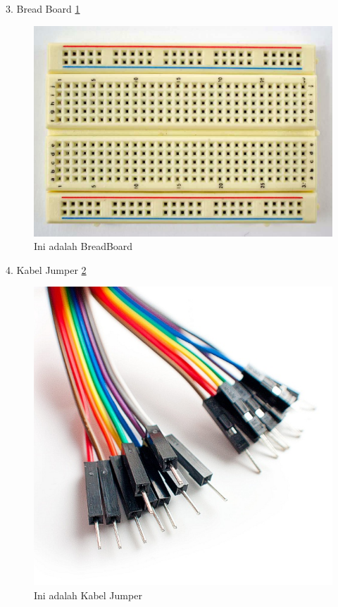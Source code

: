 \documentclass{article}
\begin{document}
 3. Bread Board
 \ref{brb}
  \begin{figure}[ht]
  \centerline{\includegraphics[width=1\textwidth]{../figures/brb.jpg}}
  \caption{Ini adalah BreadBoard}
  \label{brb}
  \end{figure}

 4. Kabel Jumper
 \ref{jumper}
  \begin{figure}[ht]
  \centerline{\includegraphics[width=1\textwidth]{../figures/jumper.jpg}}
  \caption{Ini adalah Kabel Jumper}
  \label{jumper}
  \end{figure}
\end{document}
